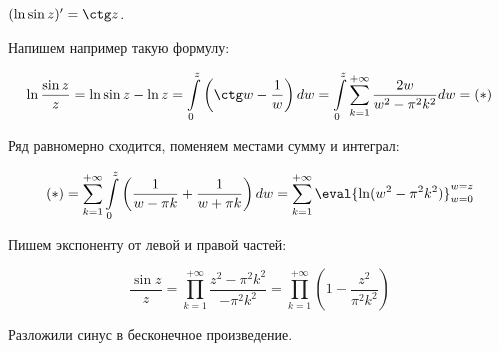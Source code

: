 \begin{example}
    $(\ln \sin z)' = \ctg z$.

    Напишем например такую формулу:

    \[
        \ln \frac{\sin z}{z}
        = \ln \sin z - \ln z
        = \int\limits_0^{z}
        \left(\ctg w - \frac{1}w\right)dw
        = \int\limits_0^z \sum\limits_{k=1}^{+\infty}
        \frac{2w}{w^2-\pi^2k^2}dw = (*)
    \]

    Ряд равномерно сходится, поменяем местами сумму и интеграл:

    \[
        (*) =
        \sum\limits_{k=1}^{+\infty}
        \int\limits_0^z \left(\frac{1}{w-\pi k} + \frac{1}{w+\pi k}\right)
        dw = \sum\limits_{k=1}^{+\infty}
        \eval{\ln (w^2-\pi^2k^2)}_{w = 0}^{w = z}
    \]

    Пишем экспоненту от левой и правой частей:

    \[
        \frac{\sin z}{z} = \prod_{k=1}^{+\infty}
        \frac{z^2-\pi^2k^2}{-\pi^2k^2}
        = \prod_{k=1}^{+\infty} \left(1 - \frac{z^2}{\pi^2 k^2}\right)
    \]

    Разложили синус в бесконечное произведение.
\end{example}

